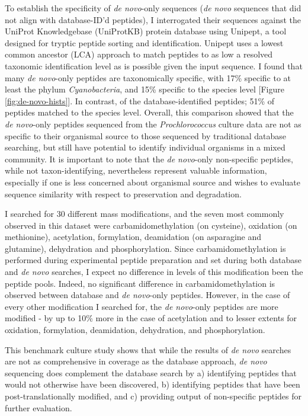 \documentclass[12pt, letterpaper, twoside]{article}
\begin{document}
To establish the specificity of \textit{de novo}-only sequences (\textit{de novo} sequences that did not align with database-ID'd peptides), I interrogated their sequences against the UniProt Knowledgebase (UniProtKB) protein database using Unipept, a tool designed for tryptic peptide sorting and identification. Unipept uses a lowest common ancestor (LCA) approach to match peptides to as low a resolved taxonomic identification level as is possible given the input sequence. I found that many \textit{de novo}-only peptides are taxonomically specific, with 17\% specific to at least the phylum \textit{Cyanobacteria}, and 15\% specific to the species level [Figure \ref{fig:de-novo-hists}]. In contrast, of the database-identified peptides; 51\% of peptides matched to the species level. Overall, this comparison showed that the \textit{de novo}-only peptides sequenced from the \textit{Prochlorococcus} culture data are not as specific to their organismal source to those sequenced by traditional database searching, but still have potential to identify individual organisms in a mixed community.  It is important to note that the \textit{de novo}-only non-specific peptides, while not taxon-identifying, nevertheless represent valuable information, especially if one is less concerned about organismal source and wishes to evaluate sequence similarity with respect to preservation and degradation.  

I searched for 30 different mass modifications, and the seven most commonly observed in this dataset were carbamidomethylation (on cysteine), oxidation (on methionine), acetylation, formylation, deamidation (on asparagine and glutamine), dehydration and phosphorylation. Since carbamidomethylation is performed during experimental peptide preparation and set during both database and \textit{de novo} searches, I expect no difference in levels of this modification been the peptide pools. Indeed, no significant difference in carbamidomethylation is observed between database and \textit{de novo}-only peptides. However, in the case of every other modification I searched for, the \textit{de novo}-only peptides are more modified - by up to 10\% more in the case of acetylation and to lesser extents for oxidation, formylation, deamidation, dehydration, and phosphorylation. 

This benchmark culture study shows that while the results of \textit{de novo} searches are not as comprehensive in coverage as the database approach, \textit{de novo} sequencing does complement the database search by a) identifying peptides that would not otherwise have been discovered, b) identifying peptides that have been post-translationally modified, and c) providing output of non-specific peptides for further evaluation. 
\end{document}
